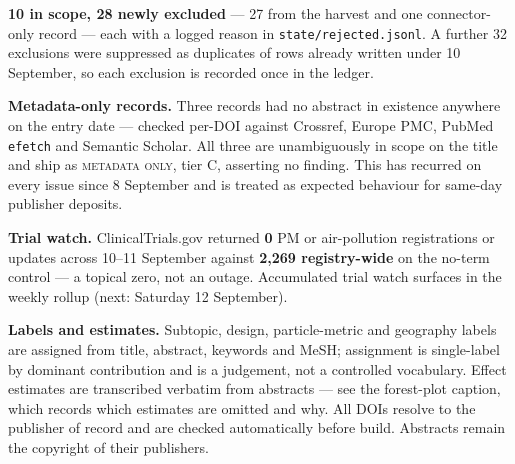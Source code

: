 \documentclass[10pt]{article}
\begin{document}
\begin{keybox}
{\textbf{10 in scope, 28 newly excluded} --- 27 from the harvest and one connector-only
record --- each with a logged reason in \texttt{state/rejected.jsonl}. A further 32
exclusions were suppressed as duplicates of rows already written under 10 September, so
each exclusion is recorded once in the ledger.\par
\vspace{0.8mm}
\textbf{Metadata-only records.} Three records had no abstract in existence anywhere on the
entry date --- checked per-DOI against Crossref, Europe PMC, PubMed \texttt{efetch} and
Semantic Scholar. All three are unambiguously in scope on the title and ship as
\textsc{metadata only}, tier C, asserting no finding. This has recurred on every issue
since 8 September and is treated as expected behaviour for same-day publisher deposits.\par
\vspace{0.8mm}
\textbf{Trial watch.} ClinicalTrials.gov returned \textbf{0} PM or air-pollution
registrations or updates across 10--11 September against \textbf{2{,}269 registry-wide} on
the no-term control --- a topical zero, not an outage. Accumulated trial watch surfaces in
the weekly rollup (next: Saturday 12 September).\par
\vspace{0.8mm}
\textbf{Labels and estimates.} Subtopic, design, particle-metric and geography labels are
assigned from title, abstract, keywords and MeSH; assignment is single-label by dominant
contribution and is a judgement, not a controlled vocabulary. Effect estimates are
transcribed verbatim from abstracts --- see the forest-plot caption, which records which
estimates are omitted and why. All DOIs resolve to the publisher of record and are checked
automatically before build. Abstracts remain the copyright of their publishers.\par}
\end{keybox}
\end{document}
